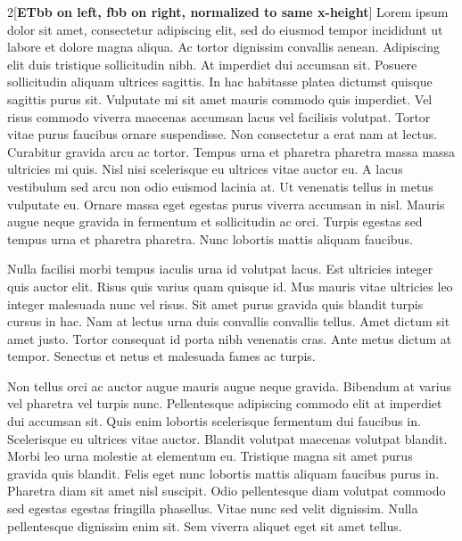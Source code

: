 \documentclass[11pt]{article}
\begin{document}
\begin{multicols}{2}[\textbf{ETbb on left, fbb on right, normalized to same x-height}]
Lorem ipsum dolor sit amet, consectetur adipiscing elit, sed do eiusmod tempor incididunt ut labore et dolore magna aliqua. Ac tortor dignissim convallis aenean. Adipiscing elit duis tristique sollicitudin nibh. At imperdiet dui accumsan sit. Posuere sollicitudin aliquam ultrices sagittis. In hac habitasse platea dictumst quisque sagittis purus sit. Vulputate mi sit amet mauris commodo quis imperdiet. Vel risus commodo viverra maecenas accumsan lacus vel facilisis volutpat. Tortor vitae purus faucibus ornare suspendisse. Non consectetur a erat nam at lectus. Curabitur gravida arcu ac tortor. Tempus urna et pharetra pharetra massa massa ultricies mi quis. Nisl nisi scelerisque eu ultrices vitae auctor eu. A lacus vestibulum sed arcu non odio euismod lacinia at. Ut venenatis tellus in metus vulputate eu. Ornare massa eget egestas purus viverra accumsan in nisl. Mauris augue neque gravida in fermentum et sollicitudin ac orci. Turpis egestas sed tempus urna et pharetra pharetra. Nunc lobortis mattis aliquam faucibus.

Nulla facilisi morbi tempus iaculis urna id volutpat lacus. Est ultricies integer quis auctor elit. Risus quis varius quam quisque id. Mus mauris vitae ultricies leo integer malesuada nunc vel risus. Sit amet purus gravida quis blandit turpis cursus in hac. Nam at lectus urna duis convallis convallis tellus. Amet dictum sit amet justo. Tortor consequat id porta nibh venenatis cras. Ante metus dictum at tempor. Senectus et netus et malesuada fames ac turpis.

Non tellus orci ac auctor augue mauris augue neque gravida. Bibendum at varius vel pharetra vel turpis nunc. Pellentesque adipiscing commodo elit at imperdiet dui accumsan sit. Quis enim lobortis scelerisque fermentum dui faucibus in. Scelerisque eu ultrices vitae auctor. Blandit volutpat maecenas volutpat blandit. Morbi leo urna molestie at elementum eu. Tristique magna sit amet purus gravida quis blandit. Felis eget nunc lobortis mattis aliquam faucibus purus in. Pharetra diam sit amet nisl suscipit. Odio pellentesque diam volutpat commodo sed egestas egestas fringilla phasellus. Vitae nunc sed velit dignissim. Nulla pellentesque dignissim enim sit. Sem viverra aliquet eget sit amet tellus.


\end{multicols}
\end{document}
